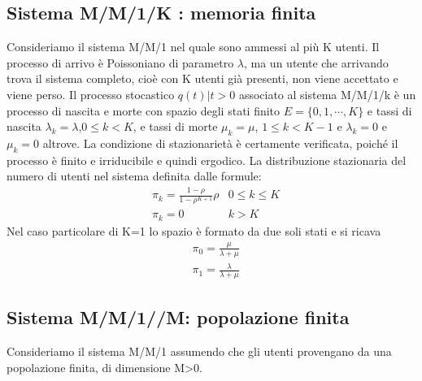 \subsection{Sistema M/M/1/K : memoria finita}
Consideriamo il sistema M/M/1 nel quale sono ammessi al più K utenti. Il processo di arrivo è Poissoniano di parametro $\lambda$, ma un utente che arrivando trova il sistema completo, cioè con K utenti già presenti, non viene accettato e viene perso. Il processo stocastico ${q(t) | t>0}$ associato al sistema M/M/1/k è un processo di nascita e morte con spazio degli stati finito $E=\{0,1,\cdots, K\}$ e tassi di nascita $\lambda_k=\lambda$,$ 0 \leq k<K$, e tassi di morte $\mu_k= \mu$, $1\leq k<K-1$ e $\lambda_k=0$ e $\mu_k= 0$ altrove. La condizione di stazionarietà è certamente verificata, poiché il processo è finito e irriducibile e quindi ergodico. La distribuzione stazionaria del numero di utenti nel sistema
definita dalle formule:
\begin{align}
    & \pi_k = \frac{1-\rho}{1 -\rho^{K+1}} \rho & 0\leq k \leq K \\
    & \pi_k = 0 & k>K
\end{align}
Nel caso particolare di K=1 lo spazio è formato da due soli stati e si ricava
\begin{align}
    & \pi_0 = \frac{\mu}{\lambda +\mu}\\
    & \pi_1 = \frac{\lambda}{\lambda + \mu}
\end{align}

\subsection{Sistema M/M/1//M: popolazione finita}
Consideriamo il sistema M/M/1 assumendo che gli utenti provengano da una popolazione finita, di dimensione M>0.